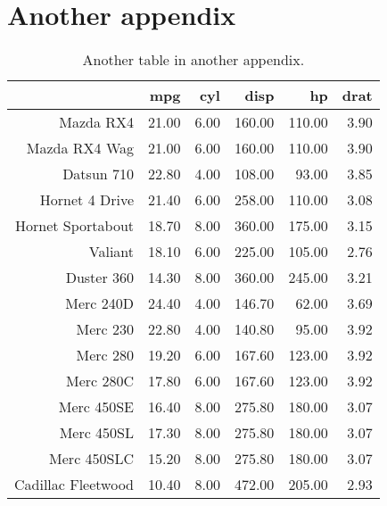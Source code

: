 \chapter{Another appendix}

\begin{table}[ht]
\centering
\begin{tabular}{rrrrrr}
  \hline
 & mpg & cyl & disp & hp & drat \\ 
  \hline
Mazda RX4 & 21.00 & 6.00 & 160.00 & 110.00 & 3.90 \\ 
  Mazda RX4 Wag & 21.00 & 6.00 & 160.00 & 110.00 & 3.90 \\ 
  Datsun 710 & 22.80 & 4.00 & 108.00 & 93.00 & 3.85 \\ 
  Hornet 4 Drive & 21.40 & 6.00 & 258.00 & 110.00 & 3.08 \\ 
  Hornet Sportabout & 18.70 & 8.00 & 360.00 & 175.00 & 3.15 \\ 
  Valiant & 18.10 & 6.00 & 225.00 & 105.00 & 2.76 \\ 
  Duster 360 & 14.30 & 8.00 & 360.00 & 245.00 & 3.21 \\ 
  Merc 240D & 24.40 & 4.00 & 146.70 & 62.00 & 3.69 \\ 
  Merc 230 & 22.80 & 4.00 & 140.80 & 95.00 & 3.92 \\ 
  Merc 280 & 19.20 & 6.00 & 167.60 & 123.00 & 3.92 \\ 
  Merc 280C & 17.80 & 6.00 & 167.60 & 123.00 & 3.92 \\ 
  Merc 450SE & 16.40 & 8.00 & 275.80 & 180.00 & 3.07 \\ 
  Merc 450SL & 17.30 & 8.00 & 275.80 & 180.00 & 3.07 \\ 
  Merc 450SLC & 15.20 & 8.00 & 275.80 & 180.00 & 3.07 \\ 
  Cadillac Fleetwood & 10.40 & 8.00 & 472.00 & 205.00 & 2.93 \\ 
   \hline
\end{tabular}
\caption{Another table in another appendix.}
\label{tbl:mtcars}
\end{table}